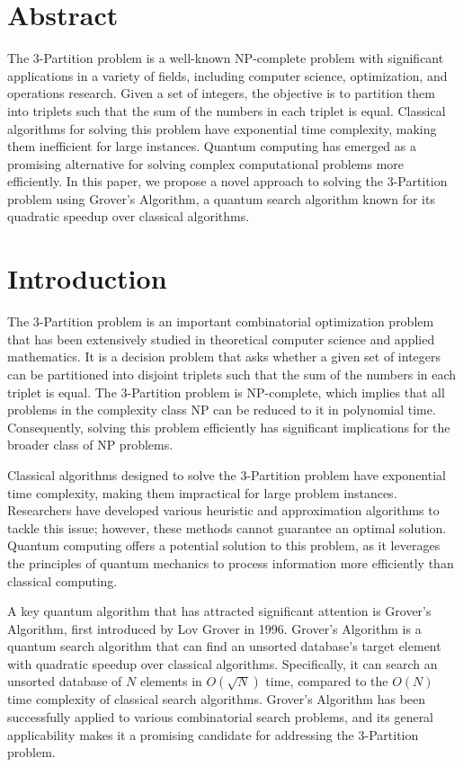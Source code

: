 \section{Abstract}

The 3-Partition problem is a well-known NP-complete problem with significant applications in a variety of fields, including computer science, optimization, and operations research. Given a set of integers, the objective is to partition them into triplets such that the sum of the numbers in each triplet is equal. Classical algorithms for solving this problem have exponential time complexity, making them inefficient for large instances. Quantum computing has emerged as a promising alternative for solving complex computational problems more efficiently. In this paper, we propose a novel approach to solving the 3-Partition problem using Grover's Algorithm, a quantum search algorithm known for its quadratic speedup over classical algorithms.

\section{Introduction}

The 3-Partition problem is an important combinatorial optimization problem that has been extensively studied in theoretical computer science and applied mathematics. It is a decision problem that asks whether a given set of integers can be partitioned into disjoint triplets such that the sum of the numbers in each triplet is equal. The 3-Partition problem is NP-complete, which implies that all problems in the complexity class NP can be reduced to it in polynomial time. Consequently, solving this problem efficiently has significant implications for the broader class of NP problems.

Classical algorithms designed to solve the 3-Partition problem have exponential time complexity, making them impractical for large problem instances. Researchers have developed various heuristic and approximation algorithms to tackle this issue; however, these methods cannot guarantee an optimal solution. Quantum computing offers a potential solution to this problem, as it leverages the principles of quantum mechanics to process information more efficiently than classical computing.

A key quantum algorithm that has attracted significant attention is Grover's Algorithm, first introduced by Lov Grover in 1996. Grover's Algorithm is a quantum search algorithm that can find an unsorted database's target element with quadratic speedup over classical algorithms. Specifically, it can search an unsorted database of $N$ elements in $O(\sqrt{N})$ time, compared to the $O(N)$ time complexity of classical search algorithms. Grover's Algorithm has been successfully applied to various combinatorial search problems, and its general applicability makes it a promising candidate for addressing the 3-Partition problem.

